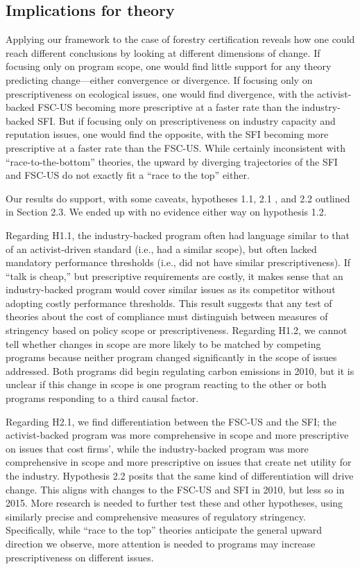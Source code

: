 \documentclass[
      12pt,
            Review ]{article}
\begin{document}
\subsection{Implications for theory}\label{implications-for-theory}

Applying our framework to the case of forestry certification reveals how
one could reach different conclusions by looking at different dimensions
of change. If focusing only on program scope, one would find little
support for any theory predicting change---either convergence or
divergence. If focusing only on prescriptiveness on ecological issues,
one would find divergence, with the activist-backed FSC-US becoming more
prescriptive at a faster rate than the industry-backed SFI. But if
focusing only on prescriptiveness on industry capacity and reputation
issues, one would find the opposite, with the SFI becoming more
prescriptive at a faster rate than the FSC-US. While certainly
inconsistent with ``race-to-the-bottom'' theories, the upward by
diverging trajectories of the SFI and FSC-US do not exactly fit a ``race
to the top'' either.

Our results do support, with some caveats, hypotheses 1.1, 2.1 , and 2.2
outlined in Section 2.3. We ended up with no evidence either way on
hypothesis 1.2.

Regarding H1.1, the industry-backed program often had language similar
to that of an activist-driven standard (i.e., had a similar scope), but
often lacked mandatory performance thresholds (i.e., did not have
similar prescriptiveness). If ``talk is cheap,'' but prescriptive
requirements are costly, it makes sense that an industry-backed program
would cover similar issues as its competitor without adopting costly
performance thresholds. This result suggests that any test of theories
about the cost of compliance must distinguish between measures of
stringency based on policy scope or prescriptiveness. Regarding H1.2, we
cannot tell whether changes in scope are more likely to be matched by
competing programs because neither program changed significantly in the
scope of issues addressed. Both programs did begin regulating carbon
emissions in 2010, but it is unclear if this change in scope is one
program reacting to the other or both programs responding to a third
causal factor.

Regarding H2.1, we find differentiation between the FSC-US and the SFI;
the activist-backed program was more comprehensive in scope and more
prescriptive on issues that cost firms', while the industry-backed
program was more comprehensive in scope and more prescriptive on issues
that create net utility for the industry. Hypothesis 2.2 posits that the
same kind of differentiation will drive change. This aligns with changes
to the FSC-US and SFI in 2010, but less so in 2015. More research is
needed to further test these and other hypotheses, using similarly
precise and comprehensive measures of regulatory stringency.
Specifically, while ``race to the top'' theories anticipate the general
upward direction we observe, more attention is needed to programs may
increase prescriptiveness on different issues.
\end{document}
